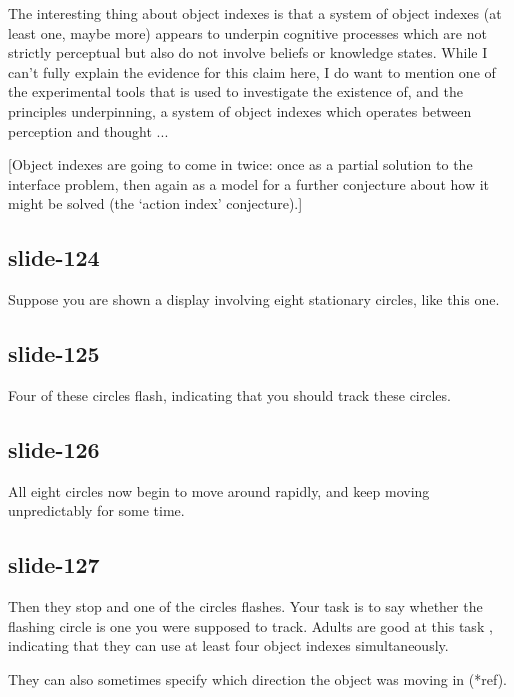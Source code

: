 \documentclass[12pt,\papersize]{extarticle}
\begin{document}
The interesting thing about object indexes is that a system of object
indexes (at least one, maybe more)
appears to underpin cognitive processes which are not
strictly perceptual but also do not involve beliefs or knowledge states.
While I can’t fully explain the evidence for this claim here,
I do want to mention one of the experimental tools that is used to
investigate the existence of, and the principles underpinning,
a system of object indexes which operates
between perception and thought ...
 
[Object indexes are going to come in twice: once as a partial solution to the
interface problem, then again as a model for a further conjecture about how it might be solved
(the ‘action index’ conjecture).]
 
\subsection{slide-124}
Suppose you are shown a display involving eight stationary circles, like
this one.
 
\subsection{slide-125}
Four of these circles flash, indicating that you should track these circles.
 
\subsection{slide-126}
All eight circles now begin to move around rapidly, and keep moving unpredictably for some time.
 
\subsection{slide-127}
Then they stop and one of the circles flashes.
Your task is to say whether the flashing circle is one you were supposed to track.
Adults are good at this task \citep{pylyshyn:1988_tracking}, indicating that they can use at least four object indexes simultaneously.
 
They can also sometimes specify which direction the object was moving in (*ref).
 
\end{document}
